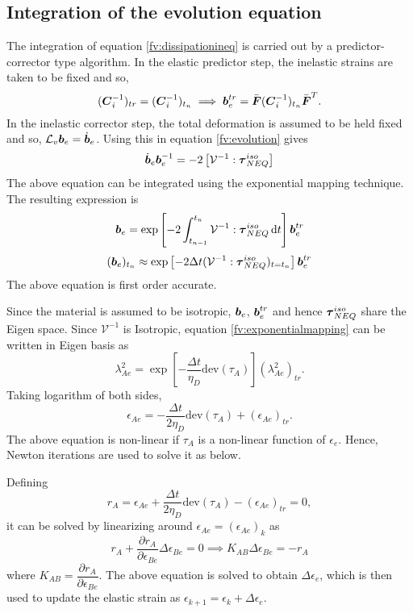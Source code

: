 \documentclass[11pt,a4paper]{article}
\newcommand{\parder}[2]{{\dfrac{\partial #1}{\partial #2}}}
\begin{document}
\subsection{Integration of the evolution equation}
The integration of equation \ref{fv:dissipationineq} is carried out by a predictor-corrector type algorithm. In the elastic predictor step, the inelastic strains are taken to be fixed and so,
\begin{equation}
	(\mbox{\boldmath $C$}_i^{-1})_{tr} = 	(\mbox{\boldmath $C$}_i^{-1})_{t_n} \implies \mbox{\boldmath $b$}_e^{tr} = \bar{\mbox{\boldmath $F$}} (\mbox{\boldmath $C$}_i^{-1})_{t_n} \bar{\mbox{\boldmath $F$}}^T.
\end{equation}
In the inelastic corrector step, the total deformation is assumed to be held fixed and so, $\mathcal{L}_v\mbox{\boldmath $b$}_e = \dot{\mbox{\boldmath $b$}}_e$. Using this in equation \ref{fv:evolution} gives
\begin{equation}
	\dot{\mbox{\boldmath $b$}}_e {\mbox{\boldmath $b$}}^{-1}_e = -2 \left[\mathcal{V}^{-1} : \boldsymbol{\tau}_{NEQ}^{iso} \right]
\end{equation}
The above equation can be integrated using the exponential mapping technique. The resulting expression is 
\begin{equation}
	{\mbox{\boldmath $b$}}_e  = \exp  \left[ -2 \int_{t_{n-1}}^{t_n} \mathcal{V}^{-1} : \boldsymbol{\tau}_{NEQ}^{iso} \mathop{}\!\mathrm{d} t \right] \mbox{\boldmath $b$}_e^{tr}
\end{equation}
\begin{equation}
	({\mbox{\boldmath $b$}}_e)_{t_n}  \approx \exp  \left[ -2 \Delta t (\mathcal{V}^{-1} : \boldsymbol{\tau}_{NEQ}^{iso})_{t=t_n} \right] \mbox{\boldmath $b$}_e^{tr}
	\label{fv:exponentialmapping}
\end{equation}
The above equation is first order accurate.

Since the material is assumed to be isotropic, ${\mbox{\boldmath $b$}}_e$, $\mbox{\boldmath $b$}_e^{tr}$ and hence $\mbox{\boldmath $\tau$}_{NEQ}^{iso}$ share the Eigen space. Since $\mathcal{V}^{-1}$ is Isotropic, equation \ref{fv:exponentialmapping} can be written in Eigen basis as
\begin{equation}
	\lambda_{Ae}^2 = \exp \left[- \frac{\Delta t }{\eta_D} \text{dev}(\tau_A) \right]  	(\lambda_{Ae}^2)_{tr}.
\end{equation}
Taking logarithm of both sides,
\begin{equation}
	\epsilon_{Ae} = - \frac{\Delta t }{2 \eta_D} \text{dev}(\tau_A) + 	(\epsilon_{Ae})_{tr}.
\end{equation}
The above equation is non-linear if $\tau_A$ is a non-linear function of $\epsilon_{e}$. Hence, Newton iterations are used to solve it as below.

Defining 
\begin{equation}
	r_A	 = \epsilon_{Ae} + \frac{\Delta t }{2 \eta_D} \text{dev}(\tau_A) - 	(\epsilon_{Ae})_{tr} = 0,
\end{equation}
it can be solved by linearizing around $\epsilon_{Ae} = (\epsilon_{Ae})_k$ as
\begin{equation}
r_A + \parder{r_A}{\epsilon_{Be}} \Delta \epsilon_{Be}	 = 0 \implies K_{AB} \Delta \epsilon_{Be}	 = -r_A
\end{equation}
where $K_{AB} = \parder{r_A}{\epsilon_{Be}}$. The above equation is solved to obtain $\Delta \epsilon_{e}$, which is then used to update the elastic strain as $\epsilon_{k+1} = \epsilon_{k} + \Delta \epsilon_{e}$.
\end{document}
